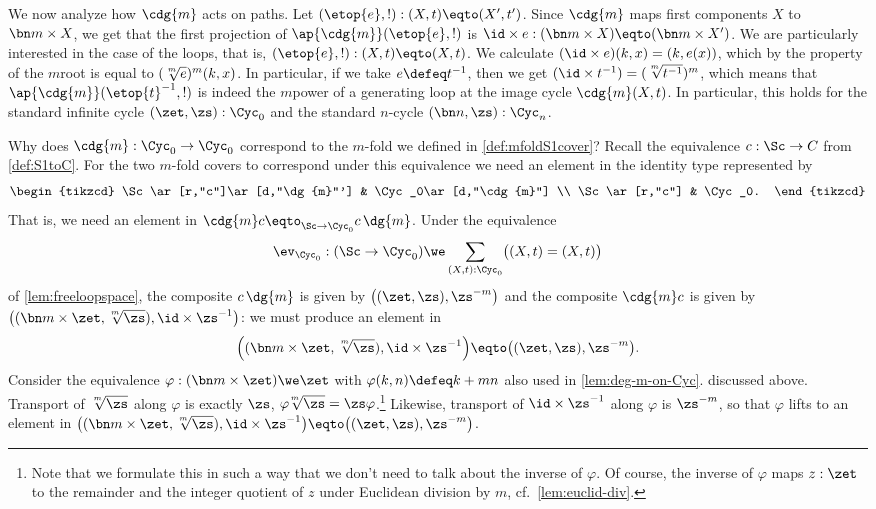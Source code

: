We now analyze how $\cdg{m}$ acts on paths.
Let $({\etop{e}},{!}):(X,t)\eqto(X',t')$.
Since $\cdg{m}$ maps first components $X$ to $\bn m\times X$, we get that
the first projection of $\ap{\cdg{m}}({\etop{e}},{!})$ is
${\id\times e} : (\bn m\times X)\eqto(\bn m\times X')$.
We are particularly interested in the case of the loops,
that is, $({\etop{e}},{!}):(X,t)\eqto(X,t)$.
We calculate $(\id\times e)(k,x) = (k,e(x))$,
which by the property of the $m$\th root is equal to $(\sqrt[\uproot{2}m]e)^m(k,x)$.
In particular, if we take $e\defeq t^{-1}$,
then we get $(\id\times t^{-1}) = (\sqrt[\uproot{2}m]{t^{-1}})^m$, which means that
$\ap{\cdg{m}}({\etop{t}^{-1}},{!})$ is indeed the $m$\th power of a
generating loop at the image cycle $\cdg{m}(X,t)$.
In particular, this holds for the standard infinite cycle $(\zet,\zs):\Cyc_0$
and the standard $n$-cycle $(\bn n,\zs):\Cyc_n$.

Why does $\cdg{m}:\Cyc_0\to\Cyc_0$
correspond to the $m$-fold \covering we defined in \cref{def:mfoldS1cover}?
Recall the equivalence $c:\Sc\to C$ from \cref{def:S1toC}.
For the two $m$-fold covers to correspond under this equivalence
we need an element in the identity type represented by
\[
  \begin{tikzcd}
    \Sc\ar[r,"c"]\ar[d,"\dg{m}"'] & \Cyc_0\ar[d,"\cdg{m}"] \\
    \Sc\ar[r,"c"] & \Cyc_0.
  \end{tikzcd}
\]
That is, we need an element in $\cdg{m}c\eqto_{\Sc\to\Cyc_0}c\,\dg{m}$.
Under the equivalence
\[
  \ev_{\Cyc_0}:(\Sc\to\Cyc_0)\we \sum_{(X,t):\Cyc_0}\bigl((X,t)=(X,t)\bigr)
\]
of \cref{lem:freeloopspace},
the composite $c\,\dg{m}$ is given by $\bigl((\zet,\zs),\zs^{-m}\bigr)$
and the composite $\cdg{m}c$ is given by
$\bigl((\bn m\times\zet,\sqrt[\uproot{2}m]{\zs}),\id\times\zs^{-1}\bigr)$:
we must produce an element in
\[
  \Bigl((\bn m\times\zet,\sqrt[\uproot{2}m]{\zs}),\id\times\zs^{-1}\Bigr)
  \eqto \bigl((\zet,\zs),\zs^{-m}\bigr).
\]
Consider the equivalence  $\varphi: (\bn m\times \zet)\we\zet$ with $\varphi(k,n)\defeq k+mn$
also used in \cref{lem:deg-m-on-Cyc}. discussed above.
Transport of $\sqrt[\uproot{2}m]\zs$ along $\varphi$ is exactly $\zs$,
\ie $\varphi\!\sqrt[\uproot{2}m]\zs=\zs\varphi$.\footnote{%
Note that we formulate this in such a way that we don't need to talk about the inverse of $\varphi$.
Of course, the inverse of $\varphi$ maps $z:\zet$ to the remainder and the integer quotient of $z$
under Euclidean division by $m$, cf.~\cref{lem:euclid-div}.}
Likewise, transport of $\id\times\zs^{-1}$ along $\varphi$ is $\zs^{-m}$,
so that $\varphi$ lifts to an element in
$\bigl((\bn m\times\zet,\sqrt[\uproot{2}m]{\zs}), \id\times\zs^{-1}\bigr)
\eqto \bigl((\zet,\zs),\zs^{-m}\bigr)$.

